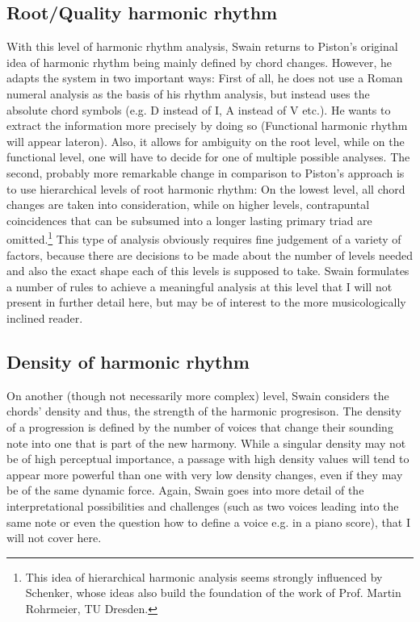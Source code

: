 \documentclass[a4paper,12pt]{report}
\begin{document}
\subsection{Root/Quality harmonic rhythm}
With this level of harmonic rhythm analysis, Swain returns to Piston's original idea of harmonic rhythm
being mainly defined by chord changes. However, he adapts the system in two important ways: First of all,
he does not use a Roman numeral analysis as the basis of his rhythm analysis, but instead uses the
absolute chord symbols (e.g. D instead of I, A instead of V etc.). He wants to extract the information more
precisely by doing so (Functional harmonic rhythm will appear lateron). Also, it allows for ambiguity on the
root level, while on the functional level, one will have to decide for one of multiple possible analyses.
The second, probably more remarkable change in comparison to Piston's approach is to use hierarchical
levels of root harmonic rhythm: On the lowest level, all chord changes are taken into consideration, while
on higher levels, contrapuntal coincidences that can be subsumed into a longer lasting primary triad are
omitted.\footnote{This idea of hierarchical harmonic analysis seems strongly influenced by Schenker,
whose ideas also build the foundation of the work of Prof. Martin Rohrmeier, TU Dresden.} This type of
analysis obviously requires fine judgement of a variety of factors, because there are decisions to be made
about the number of levels needed and also the exact shape each of this levels is supposed to take. Swain
formulates a number of rules to achieve a meaningful analysis at this level that I will not present in further
detail here, but may be of interest to the more musicologically inclined reader.

\subsection{Density of harmonic rhythm}
On another (though not necessarily more complex) level, Swain considers the chords' density and thus,
the strength of the harmonic progresison. The density of a progression is defined by the number of voices
that change their sounding note into one that is part of the new harmony. While a singular density may
not be of high perceptual importance, a passage with high density values will tend to appear more
powerful than one with very low density changes, even if they may be of the same dynamic force. Again,
Swain goes into more detail of the interpretational possibilities and challenges (such as two voices leading
into the same note or even the question how to define a voice e.g. in a piano score), that I will not cover
here.
\end{document}
